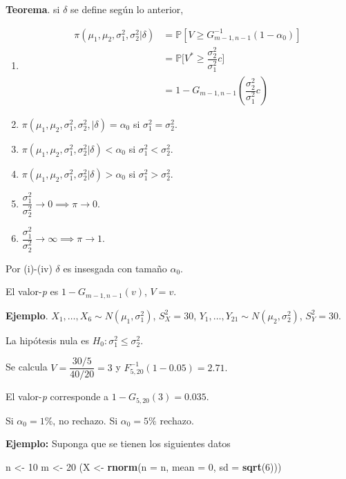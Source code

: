 \documentclass[
  12pt,
]{book}
\newenvironment{Shaded}{\begin{snugshade}}{\end{snugshade}}
\newcommand{\DataTypeTok}[1]{\textcolor[rgb]{0.13,0.29,0.53}{#1}}
\newcommand{\DecValTok}[1]{\textcolor[rgb]{0.00,0.00,0.81}{#1}}
\newcommand{\KeywordTok}[1]{\textcolor[rgb]{0.13,0.29,0.53}{\textbf{#1}}}
\newcommand{\NormalTok}[1]{#1}
\newcommand{\StringTok}[1]{\textcolor[rgb]{0.31,0.60,0.02}{#1}}
\begin{document}
\textbf{Teorema}. si \(\delta\) se define según lo anterior,

\begin{enumerate}
\def\labelenumi{\roman{enumi}.}
\item
  \begin{align*}
  \pi(\mu_1,\mu_2,\sigma_1^2,\sigma_2^2|\delta) & = \mathbb P[V\geq G^{-1}_{m-1,n-1}(1-\alpha_0)]\\
  & = \mathbb P\bigg[V^* \geq \dfrac{\sigma_2^2}{\sigma_1^2}c\bigg]\\
  & = 1-G_{m-1,n-1}\left(\dfrac{\sigma_2^2}{\sigma_1^2}c\right)
  \end{align*}
\item
  \(\pi(\mu_1,\mu_2,\sigma_1^2,\sigma_2^2,|\delta) = \alpha_0\) si \(\sigma_1^2 = \sigma_2^2\).
\item
  \(\pi(\mu_1,\mu_2,\sigma_1^2,\sigma_2^2|\delta) < \alpha_0\) si \(\sigma_1^2 < \sigma_2^2\).
\item
  \(\pi(\mu_1,\mu_2,\sigma_1^2,\sigma_2^2|\delta) > \alpha_0\) si \(\sigma_1^2 > \sigma_2^2\).
\item
  \(\dfrac{\sigma_1^2 }{\sigma_2^2 }\to 0 \implies \pi \to 0\).
\item
  \(\dfrac{\sigma_1^2 }{\sigma_2^2 }\to \infty \implies \pi \to 1\).
\end{enumerate}

Por (i)-(iv) \(\delta\) es insesgada con tamaño \(\alpha_0\).

El valor-\emph{p} es \(1-G_{m-1,n-1}(v)\), \(V=v\).

\textbf{Ejemplo}. \(X_1,\dots,X_{6}\sim N(\mu_1,\sigma_1^2)\), \(S_X ^2 =30\), \(Y_1,\dots,Y_{21}\sim N(\mu_2,\sigma_2^2)\), \(S_Y^2=30\).

La hipótesis nula es \(H_0: \sigma_1^2\leq \sigma_2^2\).

Se calcula \(V = \dfrac{30/5}{40/20} = 3\) y \(F^{-1}_{5,20}(1-0.05) = 2.71.\)

El valor-\emph{p} corresponde a \(1-G_{5,20}(3) = 0.035.\)

Si \(\alpha_0 = 1\%\), no rechazo. Si \(\alpha_0 = 5\%\) rechazo.

\textbf{Ejemplo:} Suponga que se tienen los siguientes datos

\begin{Shaded}
\begin{Highlighting}[]
\NormalTok{n \textless{}{-}}\StringTok{ }\DecValTok{10}
\NormalTok{m \textless{}{-}}\StringTok{ }\DecValTok{20}
\NormalTok{(X \textless{}{-}}\StringTok{ }\KeywordTok{rnorm}\NormalTok{(}\DataTypeTok{n =}\NormalTok{ n, }\DataTypeTok{mean =} \DecValTok{0}\NormalTok{, }\DataTypeTok{sd =} \KeywordTok{sqrt}\NormalTok{(}\DecValTok{6}\NormalTok{)))}
\end{Highlighting}
\end{Shaded}
\end{document}
